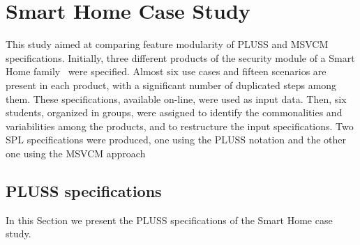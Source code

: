 \chapter{Smart Home Case Study}

This study aimed at comparing feature modularity of PLUSS and MSVCM
specifications. Initially, three different products of the security module of a
Smart Home family~\cite{Pohl:2005aa} were specified. Almost six use cases and
fifteen scenarios are present in each product, with a significant number of
duplicated steps among them. These specifications, available on-line, were used
as input data. Then, six students, organized in groups, were assigned to identify
the commonalities and variabilities among the products, and to restructure the
input specifications. Two SPL specifications were produced, one using the PLUSS
notation and the other one using the MSVCM approach

\section{PLUSS specifications}
In  this Section we present the PLUSS specifications of the Smart Home case
study.  

